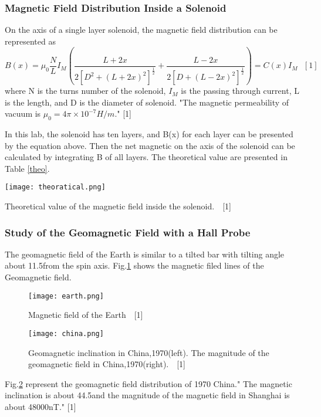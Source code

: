 \documentclass[12pt,a4paper]{article}
\begin{document}
\subsubsection{Magnetic Field Distribution Inside a Solenoid}
On the axis of a single layer solenoid, the magnetic field distribution can be represented as 
\begin{equation}
    B(x)=\mu_0\frac{N}{L}I_M(\frac{L+2x}{2[D^2+(L+2x)^2]^{\frac{1}{2}}}+\frac{L-2x}{2[D+(L-2x)^2]^{\frac{1}{2}}})=C(x)I_M ~~~[1]
\end{equation}
where N is the turns number of the solenoid, $I_M$ is the passing through current, L is the length, and D is the diameter of solenoid. "The magnetic permeability of vacuum is $\mu_0=4\pi\times{10}^{-7}H/m.$" [1] \par 
In this lab, the solenoid has ten layers, and B(x) for each layer can be presented by the equation above. Then the net magnetic on the axis of the solenoid can be calculated by integrating B of all layers. The theoretical value are presented in Table \ref{theo}.

\begin{table}[H]
    \centering
    \texttt{[image: theoratical.png]}
    \caption{Theoretical value of the magnetic field inside the solenoid.~~[1]}
    \label{theo}
\end{table}

\subsubsection{Study of the Geomagnetic Field with a Hall Probe}
The geomagnetic field of the Earth is similar to a tilted bar with tilting angle about 11.5\degree from the spin axis. Fig.\ref{earth} shows the magnetic filed lines of the Geomagnetic field.
\begin{figure}[H]
    \centering
    \texttt{[image: earth.png]}
    \caption{Magnetic field of the Earth~~[1]}
    \label{earth}
\end{figure}

\begin{figure}[H]
    \centering
    \texttt{[image: china.png]}
    \caption{Geomagnetic inclination in China,1970(left). The magnitude of the geomagnetic field in China,1970(right).~~[1]}
    \label{china}
\end{figure}

Fig.\ref{china} represent the geomagnetic field distribution of 1970 China." The magnetic inclination is about 44.5\degree and the magnitude of the magnetic field in Shanghai is about 48000nT." [1]
\end{document}
